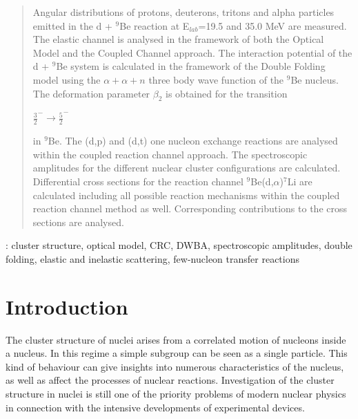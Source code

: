 \documentclass[10pt]{iopart}
\begin{document}
\begin{abstract}
Angular distributions of protons, deuterons, tritons and alpha particles emitted in the d + $^{9}$Be reaction  at E$_{lab}$=19.5 and 35.0 MeV are measured.
 The elastic channel is analysed in the framework of both the Optical Model and  the Coupled Channel approach. 
 The interaction potential of the d + $^{9}$Be system is calculated in the framework of the Double Folding model using the $\alpha+\alpha+n$ three body wave function of the $^{9}$Be nucleus.
 The deformation parameter $\beta_2$ is obtained for the transition \begin{small}  $\frac{3}{2}^{-} \rightarrow \frac{5}{2}^{-} $  \end{small} in ${}^9$Be. The (d,p) and (d,t) one nucleon exchange reactions are analysed within the coupled reaction channel approach. 
The spectroscopic amplitudes for the different nuclear cluster configurations are calculated. 
Differential cross sections for the reaction channel ${}^9$Be(d,$\alpha$)${}^7$Li are calculated including  all possible reaction mechanisms within the coupled reaction channel method as well. 
Corresponding contributions to the cross sections are analysed.
\end{abstract}
%
\vspace{2pc}
: cluster structure, optical model, CRC, DWBA, spectroscopic amplitudes, double folding, elastic and inelastic scattering, few-nucleon transfer reactions
%
%
\maketitle
%
\ioptwocol
%

\section{Introduction}
The cluster structure of nuclei arises from a correlated motion of nucleons inside a nucleus. In this regime a simple subgroup can be seen as a single particle. This kind of behaviour can give insights into numerous characteristics of the nucleus, as well as affect the processes of nuclear reactions. Investigation of the cluster structure in nuclei is still one of the priority problems of modern nuclear physics in connection with the intensive developments of experimental devices.
\end{document}
